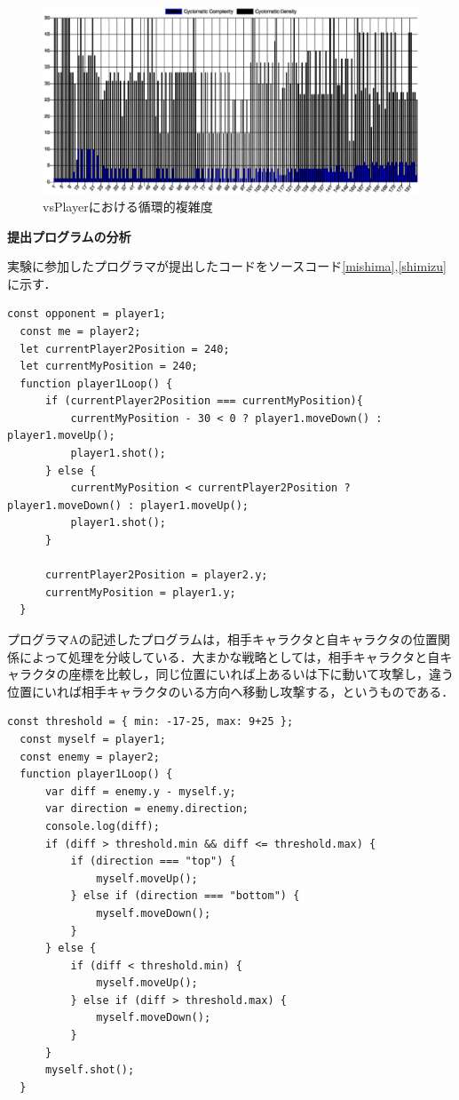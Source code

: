 \begin{figure}[!ht]
  \begin{center}
    \includegraphics[width=1.0\linewidth]{image/vsPlayer_escomplex_complexity.eps}
  \end{center}
    \vspace{-8mm} 
  \caption{vsPlayerにおける循環的複雑度}
  \label{vsPlayer_complexity}
\end{figure}

\vspace{10truept}
\noindent
{\bf 提出プログラムの分析}

実験に参加したプログラマが提出したコードをソースコード\ref{mishima},\ref{shimizu}に示す．

\begin{lstlisting}[caption=プログラマA, label=mishima]
  const opponent = player1;
  const me = player2;
  let currentPlayer2Position = 240;
  let currentMyPosition = 240;
  function player1Loop() {
      if (currentPlayer2Position === currentMyPosition){
          currentMyPosition - 30 < 0 ? player1.moveDown() : player1.moveUp();
          player1.shot();
      } else {
          currentMyPosition < currentPlayer2Position ? player1.moveDown() : player1.moveUp();
          player1.shot();
      }
      
      currentPlayer2Position = player2.y;
      currentMyPosition = player1.y;
  }
\end{lstlisting}

プログラマAの記述したプログラムは，相手キャラクタと自キャラクタの位置関係によって処理を分岐している．大まかな戦略としては，相手キャラクタと自キャラクタの座標を比較し，同じ位置にいれば上あるいは下に動いて攻撃し，違う位置にいれば相手キャラクタのいる方向へ移動し攻撃する，というものである．

\begin{lstlisting}[caption=プログラマB, label=shimizu]
  const threshold = { min: -17-25, max: 9+25 };
  const myself = player1;
  const enemy = player2;
  function player1Loop() {
      var diff = enemy.y - myself.y;
      var direction = enemy.direction;
      console.log(diff);
      if (diff > threshold.min && diff <= threshold.max) {
          if (direction === "top") {
              myself.moveUp();
          } else if (direction === "bottom") {
              myself.moveDown();
          }
      } else {
          if (diff < threshold.min) {
              myself.moveUp();
          } else if (diff > threshold.max) {
              myself.moveDown();
          }
      }
      myself.shot();
  }
\end{lstlisting}

